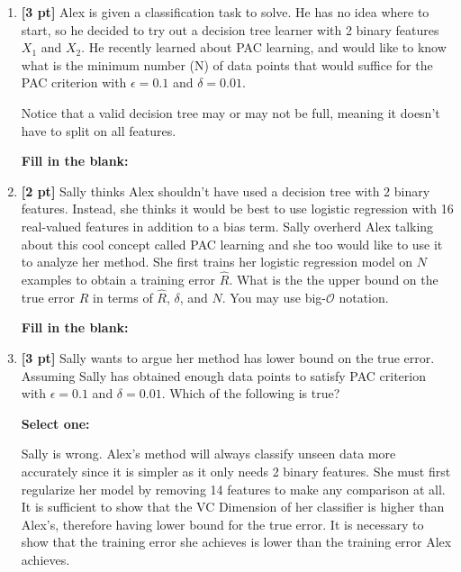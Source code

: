 \documentclass[11pt,addpoints,answers]{exam}
\begin{document}
\begin{enumerate}
    \clearpage
    
    \item \textbf{[3 pt]} Alex is given a classification task to solve. He has no idea where to start, so he decided to try out a decision tree learner with 2 binary features $X_1$ and $X_2$. He recently learned about PAC learning, and would like to know what is the minimum number (N) of data points that would suffice for the PAC criterion with $\epsilon = 0.1$ and $\delta = 0.01$. 
    
    Notice that a valid decision tree may or may not be full, meaning it doesn't have to split on all features.
    
    \textbf{Fill in the blank:}
    
    \begin{tcolorbox}[fit,height=1cm, width=4cm, blank, borderline={1pt}{-2pt},nobeforeafter]
    
    \end{tcolorbox} 
    
    
    
    \item \textbf{[2 pt]} Sally thinks Alex shouldn't have used a decision tree with 2 binary features. Instead, she thinks it would be best to use logistic regression with 16 real-valued features in addition to a bias term. Sally overherd Alex talking about this cool concept called PAC learning and she too would like to use it to analyze her method. She first trains her logistic regression model on $N$ examples to obtain a training error $\hat R$. What is the the upper bound on the true error $R$ in terms of $\hat R$, $\delta$, and $N$. You may use big-$\mathcal{O}$ notation.
    
    \textbf{Fill in the blank:}
    
    \begin{tcolorbox}[fit,height=1cm, width=15cm, blank, borderline={1pt}{-2pt},nobeforeafter]
    
    \end{tcolorbox} 
    
    
    \item \textbf{[3 pt]} Sally wants to argue her method has lower bound on the true error. Assuming Sally has obtained enough data points to satisfy PAC criterion with $\epsilon = 0.1$ and $\delta = 0.01$. Which of the following is true?
    
    \textbf{Select one:}
    \begin{checkboxes}
        \choice Sally is wrong. Alex's method will always classify unseen data more accurately since it is simpler as it only needs 2 binary features.
        \choice She must first regularize her model by removing 14 features to make any comparison at all.
        \choice It is sufficient to show that the VC Dimension of her classifier is higher than Alex's, therefore having lower bound for the true error.
        \choice It is necessary to show that the training error she achieves is lower than the training error Alex achieves.
    \end{checkboxes}
    

\end{enumerate}
\end{document}
